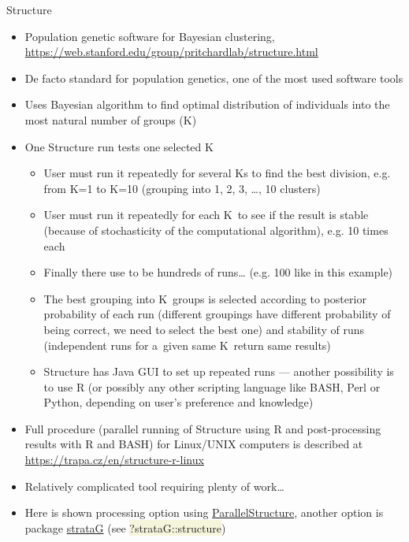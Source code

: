 \documentclass[compress, ucs, xelatex, 11pt, xcolor=svgnames, aspectratio=169,
	hyperref={
		bookmarks=true,
		unicode=true,
		colorlinks=true,
		pdftitle={Molecular data in R},
		plainpages=false,
		pdfauthor={Vojtech Zeisek},
		pdfsubject={Course about phylogeny and evolution in R},
		pdfcreator={XeLaTeX},
		pdfkeywords={R, evolution, phylogeny, molecular data},
		linkcolor=Crimson, %
		anchorcolor=Magenta, %
		citecolor=Magenta, %
		filecolor=Magenta, %
		menucolor=Magenta, %
		urlcolor=DodgerBlue, %
		pdftex},
	url={hyphens, lowtilde} %
	]{beamer}
\renewcommand{\texttt}[1]{\colorbox{Beige}{{\ttfamily #1}}}
\begin{document}
\begin{frame}[allowframebreaks]{Structure}
	\label{structure}
	\begin{itemize}
		\item Population genetic software for Bayesian clustering, \url{https://web.stanford.edu/group/pritchardlab/structure.html}
		\item De facto standard for population genetics, one of the most used software tools
		\item Uses Bayesian algorithm to find optimal distribution of individuals into the most natural number of groups (K)
		\item One Structure run tests one selected K
		\begin{itemize}
			\item User must run it repeatedly for several Ks to find the best division, e.g. from K=1 to K=10 (grouping into 1, 2, 3, \ldots, 10 clusters)
			\item User must run it repeatedly for each K~to see if the result is stable (because of stochasticity of the computational algorithm), e.g. 10 times each
			\item Finally there use to be hundreds of runs\ldots{ } (e.g. 100 like in this example)
			\item The best grouping into K~groups is selected according to posterior probability of each run (different groupings have different probability of being correct, we need to select the best one) and stability of runs (independent runs for a~given same K~return same results)
			\item Structure has Java GUI to set up repeated runs --- another possibility is to use R (or possibly any other scripting language like BASH, Perl or Python, depending on user's preference and knowledge)
		\end{itemize}
		\item Full procedure (parallel running of Structure using R and post-processing results with R and BASH) for Linux/UNIX computers is described at \url{https://trapa.cz/en/structure-r-linux}
		\item Relatively complicated tool requiring plenty of work\ldots
		\item Here is shown processing option using \href{https://r-forge.r-project.org/R/?group_id=1636}{ParallelStructure}, another option is package \href{https://CRAN.R-project.org/package=strataG}{strataG} (see \texttt{?strataG::structure})
	\end{itemize}
\end{frame}
\end{document}

